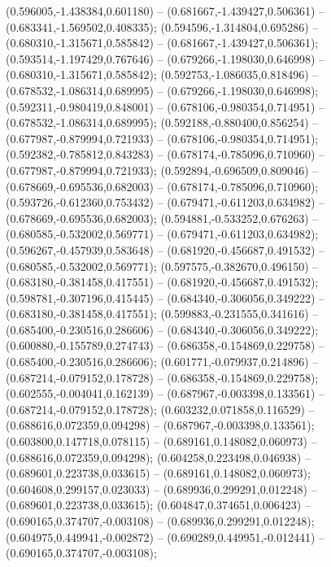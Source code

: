  (0.596005,-1.438384,0.601180) -- (0.681667,-1.439427,0.506361) -- (0.683341,-1.569502,0.408335);
 (0.594596,-1.314804,0.695286) -- (0.680310,-1.315671,0.585842) -- (0.681667,-1.439427,0.506361);
 (0.593514,-1.197429,0.767646) -- (0.679266,-1.198030,0.646998) -- (0.680310,-1.315671,0.585842);
 (0.592753,-1.086035,0.818496) -- (0.678532,-1.086314,0.689995) -- (0.679266,-1.198030,0.646998);
 (0.592311,-0.980419,0.848001) -- (0.678106,-0.980354,0.714951) -- (0.678532,-1.086314,0.689995);
 (0.592188,-0.880400,0.856254) -- (0.677987,-0.879994,0.721933) -- (0.678106,-0.980354,0.714951);
 (0.592382,-0.785812,0.843283) -- (0.678174,-0.785096,0.710960) -- (0.677987,-0.879994,0.721933);
 (0.592894,-0.696509,0.809046) -- (0.678669,-0.695536,0.682003) -- (0.678174,-0.785096,0.710960);
 (0.593726,-0.612360,0.753432) -- (0.679471,-0.611203,0.634982) -- (0.678669,-0.695536,0.682003);
 (0.594881,-0.533252,0.676263) -- (0.680585,-0.532002,0.569771) -- (0.679471,-0.611203,0.634982);
 (0.596267,-0.457939,0.583648) -- (0.681920,-0.456687,0.491532) -- (0.680585,-0.532002,0.569771);
 (0.597575,-0.382670,0.496150) -- (0.683180,-0.381458,0.417551) -- (0.681920,-0.456687,0.491532);
 (0.598781,-0.307196,0.415445) -- (0.684340,-0.306056,0.349222) -- (0.683180,-0.381458,0.417551);
 (0.599883,-0.231555,0.341616) -- (0.685400,-0.230516,0.286606) -- (0.684340,-0.306056,0.349222);
 (0.600880,-0.155789,0.274743) -- (0.686358,-0.154869,0.229758) -- (0.685400,-0.230516,0.286606);
 (0.601771,-0.079937,0.214896) -- (0.687214,-0.079152,0.178728) -- (0.686358,-0.154869,0.229758);
 (0.602555,-0.004041,0.162139) -- (0.687967,-0.003398,0.133561) -- (0.687214,-0.079152,0.178728);
 (0.603232,0.071858,0.116529) -- (0.688616,0.072359,0.094298) -- (0.687967,-0.003398,0.133561);
 (0.603800,0.147718,0.078115) -- (0.689161,0.148082,0.060973) -- (0.688616,0.072359,0.094298);
 (0.604258,0.223498,0.046938) -- (0.689601,0.223738,0.033615) -- (0.689161,0.148082,0.060973);
 (0.604608,0.299157,0.023033) -- (0.689936,0.299291,0.012248) -- (0.689601,0.223738,0.033615);
 (0.604847,0.374651,0.006423) -- (0.690165,0.374707,-0.003108) -- (0.689936,0.299291,0.012248);
 (0.604975,0.449941,-0.002872) -- (0.690289,0.449951,-0.012441) -- (0.690165,0.374707,-0.003108);

